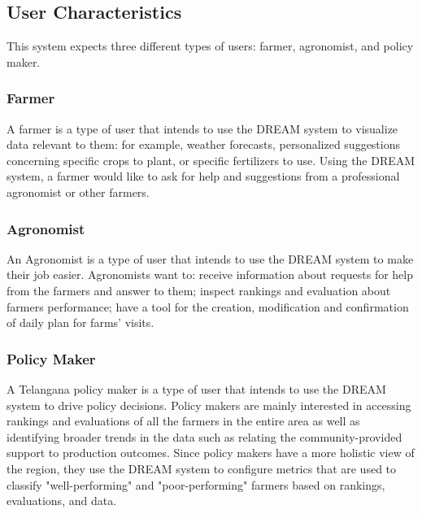 \subsection{User Characteristics}
\begin{flushleft}
This system expects three different types of users: farmer, agronomist, and policy maker.
\subsubsection{Farmer}
A farmer is a type of user that intends to use the DREAM system to visualize data relevant to them: for example, weather forecasts, personalized suggestions concerning specific crops to plant, or specific fertilizers to use.
Using the DREAM system, a farmer would like to ask for help and suggestions from a professional agronomist or other farmers.\\
\subsubsection{Agronomist}
An Agronomist is a type of user that intends to use the DREAM system to make their job easier. Agronomists want to: receive information about requests for help from the farmers and answer to them; inspect rankings and evaluation about farmers performance; have a tool for the creation, modification and confirmation of daily plan for farms' visits.
\subsubsection{Policy Maker}
A Telangana policy maker is a type of user that intends to use the DREAM system to drive policy decisions. Policy makers are mainly interested in accessing rankings and evaluations of all the farmers in the entire area as well as identifying broader trends in the data such as relating the community-provided support to production outcomes. Since policy makers have a more holistic view of the region, they use the DREAM system to configure metrics that are used to classify "well-performing" and "poor-performing" farmers based on rankings, evaluations, and data.\\
%




\end{flushleft}
